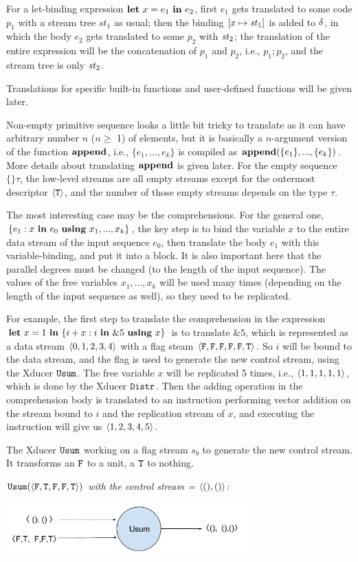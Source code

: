 For a let-binding expression $\mathbf{let} \ x = e_1 \ \mathbf{in} \ e_2$,  first $e_1$ gets translated to some code $p_1$ with a stream tree $st_1$ as usual; then the binding $[x \|-> \st_1]$ is added to $\delta$, in which the body $e_2$ gets translated to some $p_2$ with $\mathit{st}_2$; the translation of the entire expression will be the concatenation of $p_1$ and $p_2$, i.e., $p_1;p_2$, and the stream tree is only $\mathit{st}_2$.

Translations for specific built-in functions and user-defined functions will be given later.


Non-empty primitive sequence looks a little bit tricky to translate as it can have arbitrary  number $n$ ($ n \ge$ 1) of elements, but it is basically a $n$-argument version of the function $\mathbf{append}$,
i.e.,  $\{e_1,...,e_k\}$ is compiled as $\mathbf{append}(\{e_1\},...,\{e_k\})$. 
More details about translating $\mathbf{append}$ is given later. 
For the empty sequence $\{\}\tau$, the low-level streams are all empty streams except for the outermost descriptor $\langle \mathtt{T} \rangle$, and the number of those empty streams depends on the type $\tau$.

The most interesting case may be the comprehensions. 
For the general one, $\{e_1 : x \ \mathbf{in} \ e_0 \ \mathbf{using} \ x_1,...,x_k\}$, the key step is to bind the variable $x$ to the entire data stream of the input sequence $e_0$, then translate the body $e_1$ with this variable-binding, and put it into a \wc block. 
It is also important here that the parallel degrees must be changed (to the length of the input sequence).
The values of the free variables  $x_1,...,x_k$ will be used many times (depending on the length of the input sequence as well), so they need to be replicated.

For example, the first step to translate the comprehension in the expression $\mathbf{let} \ x = 1 \ \mathbf{in} \ \{i+x : i \ \mathbf{in} \ \&5 \ \mathbf{using} \ x\}$ is to translate $\&5$, which is represented as a data stream $\<0,1,2,3,4\'>$ with a flag steam $\<\F,\F,\F,\F,\F,\T\'>$.
So $i$ will be bound to the data stream, and the flag is used to generate the new control stream, using the Xducer $\mathtt{Usum}$.
The free variable $x$ will be replicated 5 times, i.e., $\<1,1,1,1,1\'>$, which is done by the Xducer $\mathtt{Distr}$.
Then the adding operation in the comprehension body is translated to an instruction performing vector addition on the stream bound to $i$ and the replication stream of $x$, and executing the instruction will give us $\<1,2,3,4,5\'>$. 


The Xducer $\mathtt{Usum}$ working on a flag stream $s_b$ to generate the new control stream. It transforms an $\mathtt{F}$ to a unit, a $\mathtt{T}$ to nothing.
\begin{example} \emph{$\usumf{\<\F,\T,\F,\F,\T\'>}$ with the control stream = $\<(),() \'>$:} \\
	\begin{center}
		\includegraphics[width=0.7\textwidth]{fig/usumxducer.png}
	\end{center}
\end{example}

